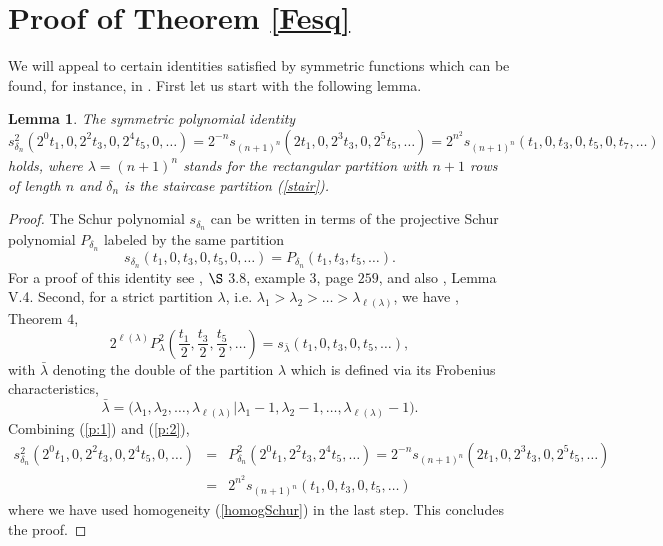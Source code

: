 \documentclass[10pt,reqno,oneside]{amsart}
\numberwithin{equation}{section}
\newtheorem{lemma}[theo]{Lemma}
\def\ri{\right}
\def\eqref#1{(\ref{#1})}
\begin{document}
\section{Proof of Theorem \ref{Fesq}}
We will appeal to certain identities satisfied by  symmetric functions which can be found, for instance, in \cite{M}. First let us start with the following lemma.
\begin{lemma}\label{lemmadouble}
The symmetric polynomial identity
\begin{equation*}
	s_{\delta_n}^2(2^0t_1,0,2^2t_3,0,2^4t_5,0,\ldots)=
2^{-n} s_{(n+1)^n} \left(2t_1,0,2^3t_3,0,2^5t_5,\dots\ri) = 
 {2^{n^2}}s_{(n+1)^{n}}\left(t_1,0,t_3,0,t_5,0,t_7,\dots\right)
\end{equation*}
holds, where $\lambda=(n+1)^{n}$ stands for the rectangular partition with $n+1$ rows of length $n$ and $\delta_n$ is the staircase partition \eqref{stair}. 
\end{lemma}
\begin{proof} The Schur polynomial $s_{\delta_n}$ can be written in terms of the projective Schur polynomial $P_{\delta_n}$ labeled by the same partition
\begin{equation}\label{p:1}
	s_{\delta_n}(t_1,0,t_3,0,t_5,0,\ldots)=P_{\delta_n}(t_1,t_3,t_5,\ldots).
\end{equation}
For a proof of this identity see \cite{M}, $\S$ 3.8, example $3$, page $259$, and also \cite{DW}, Lemma V.4. Second, for a strict partition $\lambda$, i.e. $\lambda_1>\lambda_2>\ldots>\lambda_{\ell(\lambda)}$, we have \cite{Y}, Theorem $4$,
\begin{equation}\label{p:2}
	2^{\ell(\lambda)}P_{\lambda}^2\left(\frac{t_1}{2},\frac{t_3}{2},\frac{t_5}{2},\ldots\right)=s_{\bar{\lambda}}(t_1,0,t_3,0,t_5,\ldots),
\end{equation}
with $\bar{\lambda}$ denoting the double of the partition $\lambda$ which is defined via its Frobenius characteristics,
\begin{equation*}
	\bar{\lambda}=\big(\lambda_1,\lambda_2,\ldots,\lambda_{\ell(\lambda)}\big|\lambda_1-1,\lambda_2-1,\ldots,\lambda_{\ell(\lambda)}-1\big).
\end{equation*}
Combining \eqref{p:1} and \eqref{p:2},
\begin{eqnarray*}
	s_{\delta_n}^2(2^0t_1,0,2^2t_3,0,2^4t_5,0,\ldots) &=&P_{\delta_n}^2(2^0t_1,2^2t_3,2^4t_5,\ldots)=2^{-n}s_{(n+1)^n}(2t_1,0,2^3t_3,0,2^5t_5,\ldots)\\
	&=&2^{n^2}s_{(n+1)^n}(t_1,0,t_3,0,t_5,\ldots)
\end{eqnarray*}
where we have used homogeneity \eqref{homogSchur} in the last step. This concludes the proof.
\end{proof} 
\end{document}
